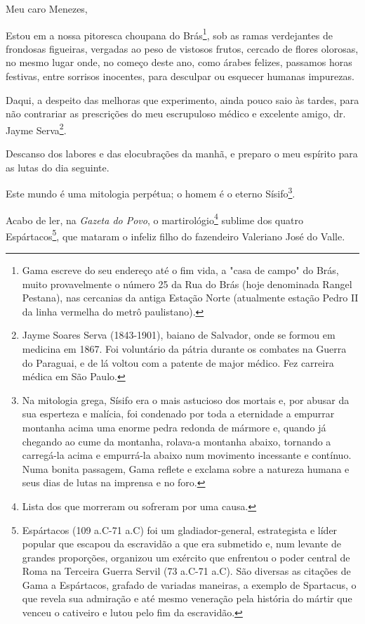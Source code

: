 Meu caro Menezes,

Estou em a nossa pitoresca choupana do Brás\footnote{Gama escreve do
  seu endereço até o fim vida, a "casa de campo" do Brás, muito
  provavelmente o número 25 da Rua do Brás (hoje denominada Rangel
  Pestana), nas cercanias da antiga Estação Norte (atualmente estação
  Pedro II da linha vermelha do metrô paulistano).}, sob as ramas
verdejantes de frondosas figueiras, vergadas ao peso de vistosos frutos,
cercado de flores olorosas, no mesmo lugar onde, no começo deste ano,
como árabes felizes, passamos horas festivas, entre sorrisos inocentes,
para desculpar ou esquecer humanas impurezas.

Daqui, a despeito das melhoras que experimento, ainda pouco saio às
tardes, para não contrariar as prescrições do meu escrupuloso médico e
excelente amigo, dr. Jayme Serva\footnote{Jayme Soares Serva
  (1843-1901), baiano de Salvador, onde se formou em medicina em 1867.
  Foi voluntário da pátria durante os combates na Guerra do Paraguai, e
  de lá voltou com a patente de major médico. Fez carreira médica em São
  Paulo.}.

Descanso dos labores e das elocubrações da manhã, e preparo o meu
espírito para as lutas do dia seguinte.

Este mundo é uma mitologia perpétua; o homem é o eterno Sísifo\footnote{
  Na mitologia grega, Sísifo era o mais astucioso dos mortais e, por
  abusar da sua esperteza e malícia, foi condenado por toda a eternidade
  a empurrar montanha acima uma enorme pedra redonda de mármore e,
  quando já chegando ao cume da montanha, rolava-a montanha abaixo,
  tornando a carregá-la acima e empurrá-la abaixo num movimento
  incessante e contínuo. Numa bonita passagem, Gama reflete e exclama
  sobre a natureza humana e seus dias de lutas na imprensa e no foro.}.

Acabo de ler, na \emph{Gazeta do Povo}, o martirológio\footnote{Lista
  dos que morreram ou sofreram por uma causa.} sublime dos quatro
Espártacos\footnote{Espártacos (109 a.C-71 a.C) foi um
  gladiador-general, estrategista e líder popular que escapou da
  escravidão a que era submetido e, num levante de grandes proporções,
  organizou um exército que enfrentou o poder central de Roma na
  Terceira Guerra Servil (73 a.C-71 a.C). São diversas as citações de
  Gama a Espártacos, grafado de variadas maneiras, a exemplo de
  Spartacus, o que revela sua admiração e até mesmo veneração pela
  história do mártir que venceu o cativeiro e lutou pelo fim da
  escravidão.}, que mataram o infeliz filho do fazendeiro Valeriano José
do Valle.

